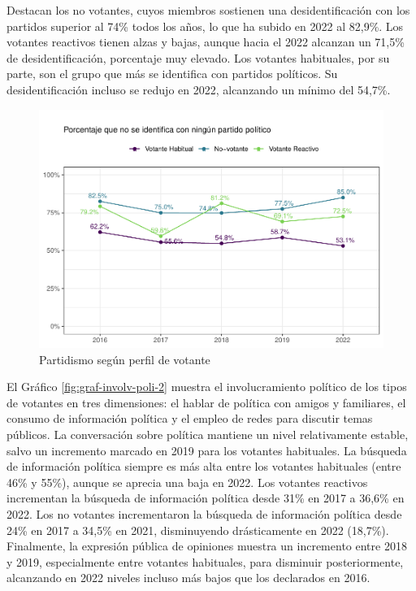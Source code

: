 \documentclass[
  12pt,
]{book}
\begin{document}
Destacan los no votantes, cuyos miembros sostienen una desidentificación con los partidos superior al 74\% todos los años, lo que ha subido en 2022 al 82,9\%. Los votantes reactivos tienen alzas y bajas, aunque hacia el 2022 alcanzan un 71,5\% de desidentificación, porcentaje muy elevado. Los votantes habituales, por su parte, son el grupo que más se identifica con partidos políticos. Su desidentificación incluso se redujo en 2022, alcanzando un mínimo del 54,7\%.

\begin{figure}

{\centering \includegraphics{reporte-elsoc_files/figure-latex/graf-id-partido-2-1} 

}

\caption{Partidismo según perfil de votante}\label{fig:graf-id-partido-2}
\end{figure}

El Gráfico \ref{fig:graf-involv-poli-2} muestra el involucramiento político de los tipos de votantes en tres dimensiones: el hablar de política con amigos y familiares, el consumo de información política y el empleo de redes para discutir temas públicos. La conversación sobre política mantiene un nivel relativamente estable, salvo un incremento marcado en 2019 para los votantes habituales. La búsqueda de información política siempre es más alta entre los votantes habituales (entre 46\% y 55\%), aunque se aprecia una baja en 2022. Los votantes reactivos incrementan la búsqueda de información política desde 31\% en 2017 a 36,6\% en 2022. Los no votantes incrementaron la búsqueda de información política desde 24\% en 2017 a 34,5\% en 2021, disminuyendo drásticamente en 2022 (18,7\%). Finalmente, la expresión pública de opiniones muestra un incremento entre 2018 y 2019, especialmente entre votantes habituales, para disminuir posteriormente, alcanzando en 2022 niveles incluso más bajos que los declarados en 2016.
\end{document}
